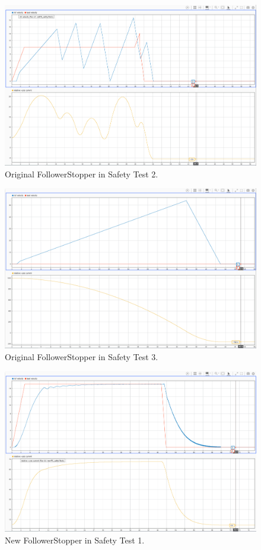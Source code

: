 \documentclass[conference]{IEEEtran}
\begin{document}
\begin{appendix}
\begin{figure}[htbp]
\centerline{\includegraphics[width=6.50 in]{oldFS_safety2.png}}
\caption{Original FollowerStopper in Safety Test 2.}
\label{fig3}
\end{figure}

\begin{figure}[htbp]
\centerline{\includegraphics[width=6.50 in]{oldFS_safety3.png}}
\caption{Original FollowerStopper in Safety Test 3.}
\label{fig3}
\end{figure}

\begin{figure}[htbp]
\centerline{\includegraphics[width=6.50 in]{newFS_safety1.png}}
\caption{New FollowerStopper in Safety Test 1.}
\label{fig3}
\end{figure}


\end{appendix}
\end{document}
